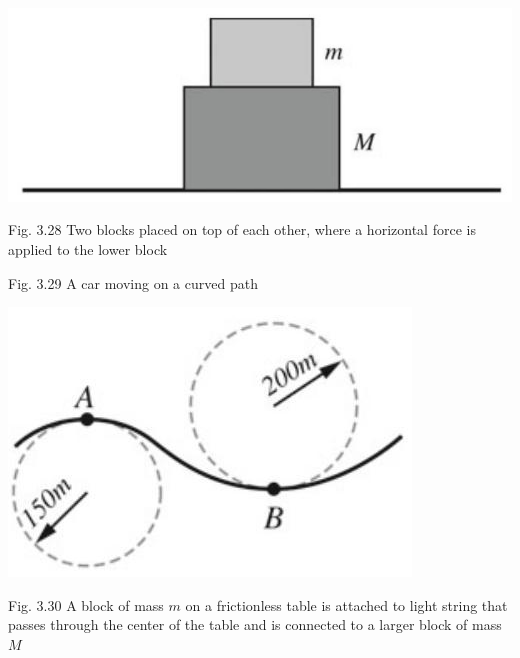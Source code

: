 \documentclass[10pt]{article}
\begin{document}
\begin{center}
\includegraphics[max width=\textwidth]{2024_09_13_db1f357d2aad0a03eb2eg-060}
\end{center}

Fig. 3.28 Two blocks placed on top of each other, where a horizontal force is applied to the lower block

Fig. 3.29 A car moving on a curved path

\begin{center}
\includegraphics[max width=\textwidth]{2024_09_13_db1f357d2aad0a03eb2eg-060(4)}
\end{center}

Fig. 3.30 A block of mass $m$ on a frictionless table is attached to light string that passes through the center of the table and is connected to a larger block of mass $M$
\end{document}
